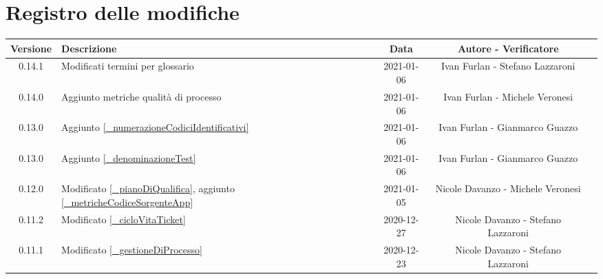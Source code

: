 \section*{Registro delle modifiche}

\begin{center}
	\begin{longtable}{|c|p{5cm}|c|c|c|}
		\hline
		\rowcolor{lighter-grayer}
		\textbf{Versione} & \textbf{Descrizione} & \textbf{Data} & \textbf{Autore - Verificatore} \\
		\hline
		\endfirsthead

		0.14.1 & Modificati termini per glossario & 2021-01-06 & Ivan Furlan - Stefano Lazzaroni \\
		0.14.0 & Aggiunto metriche qualità di processo & 2021-01-06 & Ivan Furlan - Michele Veronesi \\
		0.13.0 & Aggiunto \ref{_numerazioneCodiciIdentificativi} & 2021-01-06 & Ivan Furlan - Gianmarco Guazzo \\
		0.13.0 & Aggiunto \ref{_denominazioneTest} & 2021-01-06 & Ivan Furlan - Gianmarco Guazzo  \\
		0.12.0 & Modificato \ref{_pianoDiQualifica}, aggiunto \ref{_metricheCodiceSorgenteApp} & 2021-01-05 & Nicole Davanzo - Michele Veronesi  \\
		
		0.11.2 & Modificato \ref{_cicloVitaTicket} & 2020-12-27& Nicole Davanzo - Stefano Lazzaroni  \\
		0.11.1 & Modificato \ref{_gestioneDiProcesso} & 2020-12-23 & Nicole Davanzo - Stefano Lazzaroni  \\


\end{longtable}
\end{center}
